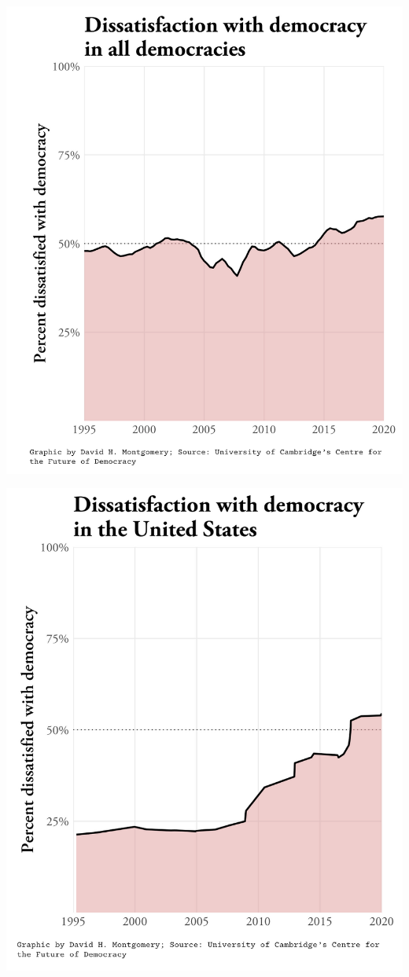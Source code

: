 \documentclass[
  ignorenonframetext,
  aspectratio=169]{beamer}
\begin{document}
\begin{frame}{}
\protect\hypertarget{section}{}
\includegraphics{img/demo-satisfaction-atlantic.png}
\end{frame}

\begin{frame}{}
\protect\hypertarget{section-1}{}
\includegraphics{img/demo-satisfaction-world-atlantic.png}
\end{frame}
\end{document}
